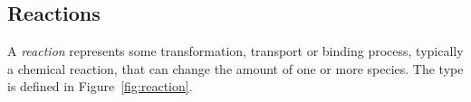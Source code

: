 \documentclass[10pt,twocolumntoc]{cekarticle}
\newcommand{\vref}[1]{\ref{#1}}
\begin{document}
%
%
%
%
%
%
%
%
%
%
%
%
%

\subsection{Reactions}
\label{sec:reactions}

A \emph{reaction} represents some transformation, transport or
binding process, typically a chemical reaction, that can change
the amount of one or more species.  The  type is
defined in Figure~\vref{fig:reaction}.
\end{document}
